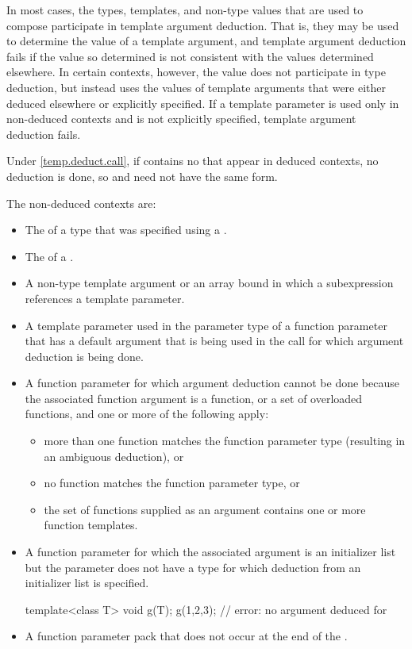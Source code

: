 \pnum
In most cases, the types, templates, and non-type values that are used
to compose
participate in template argument deduction.
That is,
they may be used to determine the value of a template argument, and
template argument deduction fails if
the value so determined is not consistent with the values determined
elsewhere.
In certain contexts, however, the value does not
participate in type deduction, but instead uses the values of template
arguments that were either deduced elsewhere or explicitly specified.
If a template parameter is used only in non-deduced contexts and is not
explicitly specified, template argument deduction fails.
\begin{note}
Under \ref{temp.deduct.call},
if  contains no  that appear
in deduced contexts, no deduction is done, so  and 
need not have the same form.
\end{note}

\pnum
The non-deduced contexts are:

%
\begin{itemize}
\item
The
of a type that was specified using a
.
\item
The  of a .
\item
A non-type template argument or an array bound in which a subexpression
references a template parameter.
\item
A template parameter used in the parameter type of a function parameter that
has a default argument that is being used in the call for which argument
deduction is being done.
\item
A function parameter for which argument deduction cannot be done because the
associated function argument is a function, or a set of overloaded
functions, and one or more of the following apply:
\begin{itemize}
\item
more than one function matches the function parameter type (resulting in
an ambiguous deduction), or
\item
no function matches the function parameter type, or
\item
the set of functions supplied as an argument contains one or more function templates.
\end{itemize}
\item A function parameter for which the associated argument is an initializer
list but the parameter does not have
a type for which deduction from an initializer list is specified.
\begin{example}
\begin{codeblock}
template<class T> void g(T);
g({1,2,3});                 // error: no argument deduced for 
\end{codeblock}
\end{example}
\item A function parameter pack that does not occur at the end of the
.
\end{itemize}

